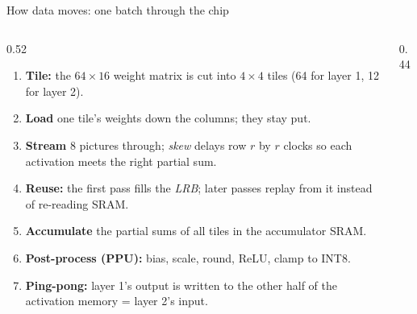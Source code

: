 \documentclass[aspectratio=169,10pt,t]{beamer}
\begin{document}
\begin{frame}{How data moves: one batch through the chip}
  \begin{columns}[T]
    \begin{column}{0.52\textwidth}
      \footnotesize
      \begin{enumerate}\setlength{\itemsep}{1.5pt}
        \item \textbf{Tile:} the $64{\times}16$ weight matrix is cut into $4{\times}4$ tiles (64 for layer 1, 12 for layer 2).
        \item \textbf{Load} one tile's weights down the columns; they stay put.
        \item \textbf{Stream} 8 pictures through; \emph{skew} delays row $r$ by $r$ clocks so each activation meets the right partial sum.
        \item \textbf{Reuse:} the first pass fills the \emph{LRB}; later passes replay from it instead of re-reading SRAM.
        \item \textbf{Accumulate} the partial sums of all tiles in the accumulator SRAM.
        \item \textbf{Post-process (PPU):} bias, scale, round, ReLU, clamp to INT8.
        \item \textbf{Ping-pong:} layer 1's output is written to the other half of the activation memory = layer 2's input.
      \end{enumerate}
    \end{column}
    \begin{column}{0.44\textwidth}
      \centering


\end{column}
\end{columns}
\end{frame}
\end{document}
